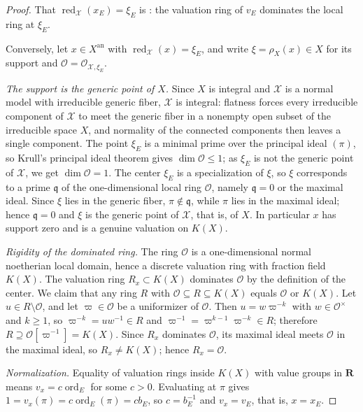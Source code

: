 \begin{proof}
That $\operatorname{red}_{\mathcal X}(x_E)=\xi_E$ is
: the valuation ring of $v_E$ dominates
the local ring at $\xi_E$.

Conversely, let $x\in X^{\mathrm{an}}$ with
$\operatorname{red}_{\mathcal X}(x)=\xi_E$, and write
$\xi=\rho_X(x)\in X$ for its support and
$\mathcal O=\mathcal O_{\mathcal X,\xi_E}$.

\emph{The support is the generic point of $X$.}
Since $X$ is integral and $\mathcal X$ is a normal model with
irreducible generic fiber, $\mathcal X$ is integral: flatness forces
every irreducible component of $\mathcal X$ to meet the generic fiber
in a nonempty open subset of the irreducible space $X$, and normality
of the connected components then leaves a single component.  The point
$\xi_E$ is a minimal prime over the principal ideal $(\pi)$, so Krull's
principal ideal theorem gives $\dim\mathcal O\le 1$; as $\xi_E$ is not
the generic point of $\mathcal X$, we get $\dim\mathcal O=1$.  The
center $\xi_E$ is a specialization of $\xi$, so $\xi$ corresponds
to a prime $\mathfrak q$ of the one-dimensional local ring
$\mathcal O$, namely $\mathfrak q=0$ or the maximal ideal.  Since
$\xi$ lies in the generic fiber, $\pi\notin\mathfrak q$, while
$\pi$ lies in the maximal ideal; hence $\mathfrak q=0$ and $\xi$
is the generic point of $\mathcal X$, that is, of $X$.  In
particular $x$ has support zero and is a genuine valuation on
$K(X)$.

\emph{Rigidity of the dominated ring.}
The ring $\mathcal O$ is a one-dimensional normal noetherian local
domain, hence a discrete valuation ring with fraction field $K(X)$.
The valuation ring $R_x\subset K(X)$ dominates $\mathcal O$ by the
definition of the center.  We claim that any ring $R$ with
$\mathcal O\subseteq R\subseteq K(X)$ equals $\mathcal O$ or
$K(X)$.  Let $u\in R\setminus\mathcal O$, and let
$\varpi\in\mathcal O$ be a uniformizer of $\mathcal O$.  Then
$u=w\varpi^{-k}$ with $w\in\mathcal O^\times$ and $k\geq1$, so
$\varpi^{-k}=uw^{-1}\in R$ and
$\varpi^{-1}=\varpi^{k-1}\varpi^{-k}\in R$; therefore
$R\supseteq\mathcal O[\varpi^{-1}]=K(X)$.  Since $R_x$ dominates
$\mathcal O$, its maximal ideal meets $\mathcal O$ in the maximal
ideal, so $R_x\neq K(X)$; hence $R_x=\mathcal O$.

\emph{Normalization.}
Equality of valuation rings inside $K(X)$ with value groups in
$\mathbf R$ means $v_x=c\operatorname{ord}_E$ for some $c>0$.
Evaluating at $\pi$ gives
$1=v_x(\pi)=c\operatorname{ord}_E(\pi)=cb_E$, so $c=b_E^{-1}$ and
$v_x=v_E$, that is, $x=x_E$.
\end{proof}

